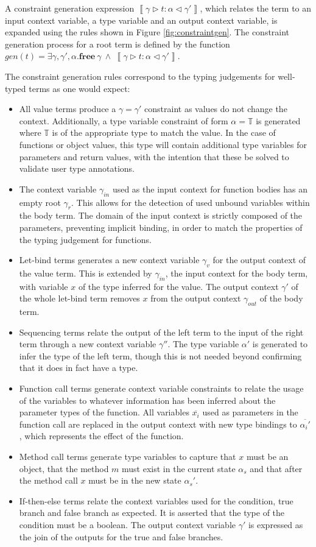 \documentclass[preprint]{sigplanconf}
\newcommand{\figref}[1]{Figure \ref{#1}}
\newcommand{\inferlhs}[1]{\left\llbracket \gamma \triangleright #1 : \alpha \triangleleft \gamma' \right\rrbracket}
\newcommand{\cand}{\:\wedge\:}
\newcommand{\free}[1]{\mathbf{free}\:#1}
\newcommand{\tinf}{\mathbb{T}}
\begin{document}
A constraint generation expression $\inferlhs{t}$, which relates the term
to an input context variable, a type variable and an output context variable, 
is expanded using the rules shown in \figref{fig:constraintgen}.
The constraint generation process for a root term is defined
by the function $gen(t) = \exists \gamma, \gamma', \alpha. \free{\gamma} \cand \inferlhs{t}$.

The constraint generation rules correspond to the typing judgements for 
well-typed terms as one would expect:

\begin{itemize}
\item All value terms produce a $\gamma = \gamma'$ constraint as values do
not change the context. Additionally, a type variable constraint of form
$\alpha = \tinf$ is generated where $\tinf$ is of the appropriate type to 
match the value. In the case of functions or object values, this type will
contain additional type variables for parameters and return values, with
the intention that these be solved to validate user type annotations.
\item The context variable $\gamma_{in}$ used as the input context for
function bodies has an empty root $\gamma_r$. This allows for the detection of 
used unbound variables within
the body term. The domain of the input context is strictly composed of the 
parameters, preventing implicit binding, in order to match the properties
of the typing judgement for functions.
\item Let-bind terms generates a new context variable $\gamma_v$ for the
output context of the value term. This is extended by $\gamma_{in}$, the
input context for the body term, with variable $x$ of the type inferred
for the value. The output context $\gamma'$ of the whole let-bind term removes
$x$ from the output context $\gamma_{out}$ of the body term.
\item Sequencing terms relate the output of the left term to the input of the
right term through a new context variable $\gamma''$. The type variable
$\alpha'$ is generated to infer the type of the left term, though this is not needed beyond confirming that it does in fact have a type.
\item Function call terms generate context variable constraints to relate the
usage of the variables to whatever information has been inferred about the
parameter types of the function. All variables $\overline{x_i}$ used as 
parameters in the function call are replaced in the output context with
new type bindings to $\overline{\alpha_i'}$, which represents the effect
of the function.
\item Method call terms generate type variables to capture that $x$ must
be an object, that the method $m$ must exist in the current state $\alpha_s$
and that after the method call $x$ must be in the new state $\alpha_s'$.
\item If-then-else terms relate the context variables used for the
condition, true branch and false branch as expected. It is asserted that the
type of the condition must be a boolean. The output context
variable $\gamma'$ is expressed as the join of the outputs for the true
and false branches.
\end{itemize}
\end{document}
